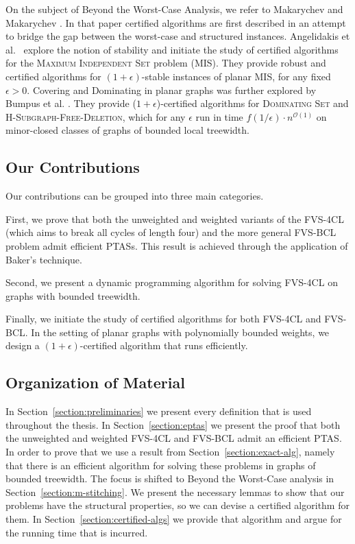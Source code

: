 On the subject of Beyond the Worst-Case Analysis, we refer to Makarychev and Makarychev \cite{Makarychev_Makarychev_2021}. 
In that paper certified algorithms are first described in an attempt to bridge the gap between the worst-case and structured instances. 
Angelidakis et al.~\cite{angelidakis2018bilu} explore the notion of stability and initiate the study of certified algorithms 
for the \textsc{Maximum Independent Set} problem (\textsc{MIS}). They provide robust and certified algorithms for $(1 + \epsilon)$-stable instances 
of planar \textsc{MIS}, for any fixed $\epsilon > 0$. Covering and Dominating in planar graphs was further explored by Bumpus et al. \cite{bumpus_et_al:LIPIcs.SWAT.2024.19}. 
They provide ($1 + \epsilon$)-certified algorithms for \textsc{Dominating Set} and \textsc{H-Subgraph-Free-Deletion}, which for any $\epsilon$ 
run in time $f(1/\epsilon) \cdot n^{\mathcal{O}(1)}$ on minor-closed classes of graphs of bounded local treewidth.

\subsection*{Our Contributions}

Our contributions can be grouped into three main categories.

First, we prove that both the unweighted and weighted variants of the FVS-4CL 
(which aims to break all cycles of length four) and the more general FVS-BCL problem admit 
efficient PTASs. This result is achieved through the application of Baker's technique.

Second, we present a dynamic programming algorithm for solving FVS-4CL on graphs with 
bounded treewidth.

Finally, we initiate the study of certified algorithms for both FVS-4CL and FVS-BCL. 
In the setting of planar graphs with polynomially bounded weights, we design a 
$(1+\epsilon)$-certified algorithm that runs efficiently.

\subsection*{Organization of Material}

In Section~\ref{section:preliminaries} we present every definition that is used throughout the thesis. 
In Section~\ref{section:eptas} we present 
the proof that both the unweighted and weighted FVS-4CL and FVS-BCL admit an efficient PTAS. In order 
to prove that we use a result from Section~\ref{section:exact-alg}, namely that there is an efficient algorithm for solving 
these problems in graphs of bounded treewidth. The focus is shifted to Beyond the Worst-Case analysis in 
Section~\ref{section:m-stitching}. We present the necessary lemmas to show that our problems have the structural properties, so 
we can devise a certified algorithm for them. In Section~\ref{section:certified-algs} we provide that algorithm and argue for 
the running time that is incurred.